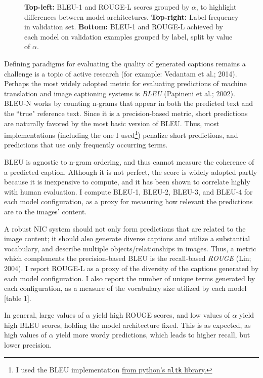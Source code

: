 \documentclass[letterpaper, 10 pt, conference]{ieeeconf}
\begin{document}
\begin{figure}[h]
\caption{\textbf{Top-left:} BLEU-1 and ROUGE-L scores grouped by $\alpha$, to highlight differences between model architectures. \textbf{Top-right:} Label frequency in validation set. \textbf{Bottom:} BLEU-1 and ROUGE-L achieved by each model on validation examples grouped by label, split by value of $\alpha$.}
\end{figure}

Defining paradigms for evaluating the quality of generated captions remains a challenge is a topic of active research (for example: Vedantam et al.; 2014). Perhaps the most widely adopted metric for evaluating predictions of machine translation and image captioning systems is \textit{BLEU} (Papineni et al.; 2002). BLEU-N works by counting n-grams that appear in both the predicted text and the ``true" reference text. Since it is a precision-based metric, short predictions are naturally favored by the most basic version of BLEU. Thus, most implementations (including the one I used\footnote{I used the BLEU implementation \href{https://www.nltk.org/_modules/nltk/translate/bleu_score.html}{from python's \texttt{nltk} library.}}) penalize short predictions, and predictions that use only frequently occurring terms. 

BLEU is agnostic to n-gram ordering, and thus cannot measure the coherence of a predicted caption. Although it is not perfect, the score is widely adopted partly because it is inexpensive to compute, and it has been shown to correlate highly with human evaluation. I compute BLEU-1, BLEU-2, BLEU-3, and BLEU-4 for each model configuration, as a proxy for measuring how relevant the predictions are to the images' content.

A robust NIC system should not only form predictions that are related to the image content; it should also generate diverse captions and utilize a substantial vocabulary, and describe multiple objects/relationships in images. Thus, a metric which complements the precision-based BLEU is the recall-based \textit{ROUGE} (Lin; 2004). I report ROUGE-L as a proxy of the diversity of the captions generated by each model configuration. I also report the number of unique terms generated by each configuration, as a measure of the vocabulary size utilized by each model [table 1].


In general, large values of $\alpha$ yield high ROUGE scores, and low values of $\alpha$ yield high BLEU scores, holding the model architecture fixed. This is as expected, as high values of $\alpha$ yield more wordy predictions, which leads to higher recall, but lower precision. 
\end{document}
